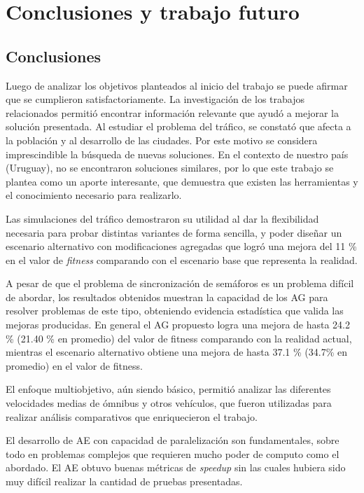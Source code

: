 \chapter{Conclusiones y trabajo futuro}

\section{Conclusiones}
Luego de analizar los objetivos planteados al inicio del trabajo se puede afirmar que se cumplieron satisfactoriamente.
La investigación de los trabajos relacionados permitió encontrar información relevante que ayudó a mejorar la solución presentada. 
Al estudiar el problema del tráfico, se constató  que afecta a la población y al desarrollo de las ciudades. Por este motivo se considera imprescindible la búsqueda de nuevas soluciones. En el contexto de nuestro país (Uruguay), no se encontraron soluciones similares, por lo que este trabajo se plantea como un aporte interesante, que demuestra que existen las herramientas y el conocimiento necesario para realizarlo.
 
Las simulaciones del tráfico demostraron su utilidad al dar la flexibilidad necesaria para probar distintas variantes de forma sencilla, y poder diseñar un escenario alternativo con modificaciones agregadas que logró una mejora del 11 \% en el valor de \emph{fitness} comparando con el escenario base que representa la realidad.
 
A pesar de que el problema de sincronización de semáforos es un problema difícil de abordar, los resultados obtenidos muestran la capacidad de los AG para resolver problemas de este tipo, obteniendo evidencia estadística que valida las mejoras producidas. En general el AG propuesto logra una mejora de hasta  24.2 \% (21.40 \% en promedio) del valor de fitness comparando con la realidad actual, mientras el escenario alternativo obtiene una mejora de hasta 37.1 \% (34.7\% en promedio) en el valor de fitness.

El enfoque multiobjetivo, aún siendo básico, permitió analizar las diferentes velocidades medias de ómnibus y otros vehículos, que fueron utilizadas para realizar análisis comparativos que enriquecieron el trabajo.

El desarrollo de AE con capacidad de paralelización son fundamentales, sobre todo en problemas complejos que requieren mucho poder de computo como el abordado. El AE obtuvo buenas métricas de \emph{speedup} sin las cuales hubiera sido muy difícil realizar la cantidad de pruebas presentadas.

